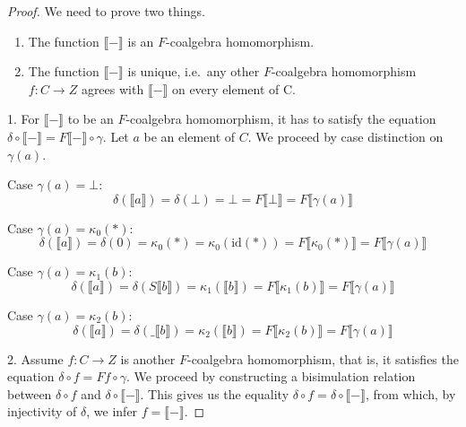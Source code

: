 \documentclass[a4paper]{article}
\newcommand{\arr}{\rightarrow}
\newcommand{\semantics}[1]{\llbracket #1 \rrbracket}
\begin{document}
\begin{proof}

We need to prove two things.

  \begin{enumerate}
  \item
    The function $\semantics{-}$ is an $F$-coalgebra homomorphism.
  \item
    The function $\semantics{-}$ is unique, i.e.~any other $F$-coalgebra
    homomorphism $f : C \arr Z$ agrees with $\semantics{-}$ on every element of C.
  \end{enumerate}

1. For $\semantics{-}$ to be an
$F$-coalgebra homomorphism, it has to satisfy the equation $\delta \circ
\semantics{-} = F\semantics{-} \circ \gamma$.  Let $a$ be an element of $C$. We
proceed by case distinction on $\gamma(a)$.

Case $\gamma(a) = \bot$:
\begin{equation*}
\delta(\semantics{a}) = \delta(\bot) = \bot =
F\semantics{\bot} = F\semantics{\gamma(a)}
\end{equation*}

Case $\gamma(a) = \kappa_0(*)$:
\begin{equation*}
\delta(\semantics{a}) = \delta(0) = \kappa_0(*)
= \kappa_0(\text{id}(*)) = F\semantics{\kappa_0(*)} = F\semantics{\gamma(a)}
\end{equation*}

Case $\gamma(a) = \kappa_1(b)$:
\begin{equation*}
\delta(\semantics{a}) = \delta(S \semantics{b}) = \kappa_1(\semantics{b}) =
F\semantics{\kappa_1(b)} = F\semantics{\gamma(a)}
\end{equation*}

Case $\gamma(a) = \kappa_2(b)$:
\begin{equation*}
\delta(\semantics{a}) = \delta(\_ \semantics{b}) = \kappa_2(\semantics{b}) =
F\semantics{\kappa_2(b)} = F\semantics{\gamma(a)}
\end{equation*}

2. Assume $f : C \arr Z$ is another $F$-coalgebra homomorphism, that is, it
satisfies the equation $\delta \circ f = Ff \circ \gamma$.  We proceed by
constructing a bisimulation relation between $\delta \circ f$ and $\delta \circ
\semantics{-}$.  This gives us the equality $\delta \circ f = \delta \circ
\semantics{-}$, from which, by injectivity of $\delta$, we infer $f =
\semantics{-}$.

\end{proof}
\end{document}
